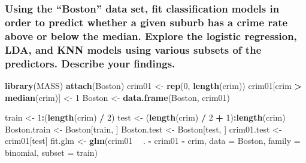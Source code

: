 \documentclass[]{article}
\newenvironment{Shaded}{\begin{snugshade}}{\end{snugshade}}
\newcommand{\KeywordTok}[1]{\textcolor[rgb]{0.13,0.29,0.53}{\textbf{#1}}}
\newcommand{\DataTypeTok}[1]{\textcolor[rgb]{0.13,0.29,0.53}{#1}}
\newcommand{\DecValTok}[1]{\textcolor[rgb]{0.00,0.00,0.81}{#1}}
\newcommand{\StringTok}[1]{\textcolor[rgb]{0.31,0.60,0.02}{#1}}
\newcommand{\OperatorTok}[1]{\textcolor[rgb]{0.81,0.36,0.00}{\textbf{#1}}}
\newcommand{\NormalTok}[1]{#1}
\begin{document}
\subsubsection{\texorpdfstring{Using the ``Boston'' data set, fit
classification models in order to predict whether a given suburb has a
crime rate above or below the median. Explore the logistic regression,
LDA, and KNN models using various subsets of the predictors. Describe
your
findings.}{Using the Boston data set, fit classification models in order to predict whether a given suburb has a crime rate above or below the median. Explore the logistic regression, LDA, and KNN models using various subsets of the predictors. Describe your findings.}}\label{using-the-boston-data-set-fit-classification-models-in-order-to-predict-whether-a-given-suburb-has-a-crime-rate-above-or-below-the-median.-explore-the-logistic-regression-lda-and-knn-models-using-various-subsets-of-the-predictors.-describe-your-findings.}

\begin{Shaded}
\begin{Highlighting}[]
\KeywordTok{library}\NormalTok{(MASS)}
\KeywordTok{attach}\NormalTok{(Boston)}
\NormalTok{crim01 <-}\StringTok{ }\KeywordTok{rep}\NormalTok{(}\DecValTok{0}\NormalTok{, }\KeywordTok{length}\NormalTok{(crim))}
\NormalTok{crim01[crim }\OperatorTok{>}\StringTok{ }\KeywordTok{median}\NormalTok{(crim)] <-}\StringTok{ }\DecValTok{1}
\NormalTok{Boston <-}\StringTok{ }\KeywordTok{data.frame}\NormalTok{(Boston, crim01)}

\NormalTok{train <-}\StringTok{ }\DecValTok{1}\OperatorTok{:}\NormalTok{(}\KeywordTok{length}\NormalTok{(crim) }\OperatorTok{/}\StringTok{ }\DecValTok{2}\NormalTok{)}
\NormalTok{test <-}\StringTok{ }\NormalTok{(}\KeywordTok{length}\NormalTok{(crim) }\OperatorTok{/}\StringTok{ }\DecValTok{2} \OperatorTok{+}\StringTok{ }\DecValTok{1}\NormalTok{)}\OperatorTok{:}\KeywordTok{length}\NormalTok{(crim)}
\NormalTok{Boston.train <-}\StringTok{ }\NormalTok{Boston[train, ]}
\NormalTok{Boston.test <-}\StringTok{ }\NormalTok{Boston[test, ]}
\NormalTok{crim01.test <-}\StringTok{ }\NormalTok{crim01[test]}
\NormalTok{fit.glm <-}\StringTok{ }\KeywordTok{glm}\NormalTok{(crim01 }\OperatorTok{~}\StringTok{ }\NormalTok{. }\OperatorTok{-}\StringTok{ }\NormalTok{crim01 }\OperatorTok{-}\StringTok{ }\NormalTok{crim, }\DataTypeTok{data =}\NormalTok{ Boston, }\DataTypeTok{family =}\NormalTok{ binomial, }\DataTypeTok{subset =}\NormalTok{ train)}
\end{Highlighting}
\end{Shaded}
\end{document}
